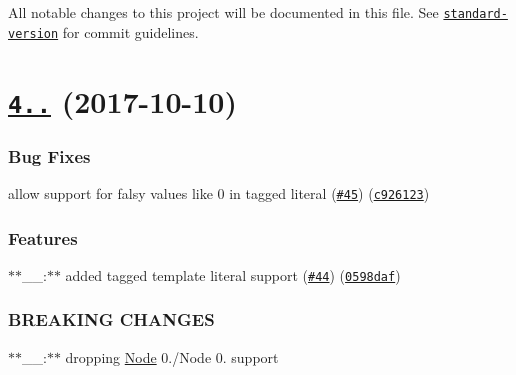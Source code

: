 All notable changes to this project will be documented in this file. See \href{https://github.com/conventional-changelog/standard-version}{\tt standard-\/version} for commit guidelines.

\label{_4.0.0}%
 \section*{\href{https://github.com/yargs/y18n/compare/v3.2.1...v4.0.0}{\tt 4..} (2017-\/10-\/10)}

\subsubsection*{Bug Fixes}


\begin{DoxyItemize}
\item allow support for falsy values like 0 in tagged literal (\href{https://github.com/yargs/y18n/issues/45}{\tt \#45}) (\href{https://github.com/yargs/y18n/commit/c926123}{\tt c926123})
\end{DoxyItemize}

\subsubsection*{Features}


\begin{DoxyItemize}
\item $\ast$$\ast$\+\_\+\+\_\+\+:$\ast$$\ast$ added tagged template literal support (\href{https://github.com/yargs/y18n/issues/44}{\tt \#44}) (\href{https://github.com/yargs/y18n/commit/0598daf}{\tt 0598daf})
\end{DoxyItemize}

\subsubsection*{B\+R\+E\+A\+K\+I\+NG C\+H\+A\+N\+G\+ES}


\begin{DoxyItemize}
\item $\ast$$\ast$\+\_\+\+\_\+\+:$\ast$$\ast$ dropping \mbox{\hyperlink{classNode}{Node}} 0./\+Node 0. support 
\end{DoxyItemize}